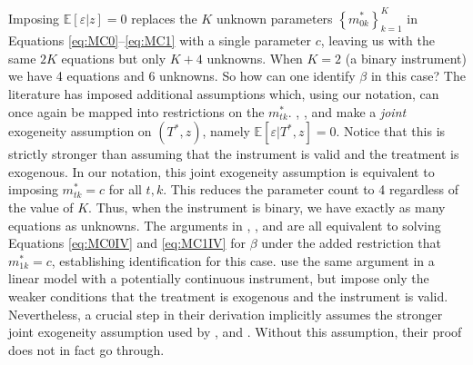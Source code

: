 Imposing $\mathbb{E}[\varepsilon|z]=0$ replaces the $K$ unknown parameters $\left\{ m^*_{0k}\right\}_{k=1}^K$ in Equations \ref{eq:MC0}--\ref{eq:MC1} with a single parameter $c$, leaving us with the same $2K$ equations but only $K+4$ unknowns.
When $K=2$ (a binary instrument) we have 4 equations and 6 unknowns.
So how can one identify $\beta$ in this case?
The literature has imposed additional assumptions which, using our notation, can once again be mapped into restrictions on the $m_{tk}^*$.
\cite{BBS}, \cite{KRS}, and \cite{Mahajan} make a \emph{joint} exogeneity assumption on $(T^*,z)$, namely $\mathbb{E}[\varepsilon|T^*,z]=0$.
Notice that this is strictly stronger than assuming that the instrument is valid and the treatment is exogenous.
In our notation, this joint exogeneity assumption is equivalent to imposing $m_{tk}^*=c$ for all $t,k$.
This reduces the parameter count to 4 regardless of the value of $K$.
Thus, when the instrument is binary, we have exactly as many equations as unknowns.
The arguments in \cite{BBS}, \cite{KRS}, and \cite{Mahajan} are all equivalent to solving Equations \ref{eq:MC0IV} and \ref{eq:MC1IV} for $\beta$ under the added restriction that $m^*_{1k}=c$, establishing identification for this case.
\cite{FL} use the same argument in a linear model with a potentially continuous instrument, but impose only the weaker conditions that the treatment is exogenous and the instrument is valid. 
Nevertheless, a crucial step in their derivation implicitly assumes the stronger joint exogeneity assumption used by \cite{BBS}, \cite{KRS} and \cite{Mahajan}.
Without this assumption, their proof does not in fact go through.

